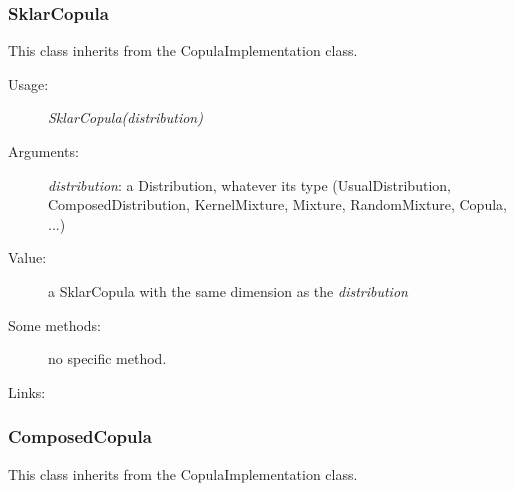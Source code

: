 \newpage
\subsubsection{SklarCopula}

This class inherits from the CopulaImplementation class.

\begin{description}

\item[Usage:] \textit{SklarCopula(distribution)}

\item[Arguments:] \textit{distribution}: a Distribution, whatever its type (UsualDistribution, ComposedDistribution, KernelMixture, Mixture, RandomMixture, Copula, ...)

\item[Value:]  a  SklarCopula with the same dimension as the \textit{distribution}

\item[Some methods:]  no specific method.
\item[Links:]
\end{description}




\newpage
\subsubsection{ComposedCopula}


This class inherits from the CopulaImplementation class.


